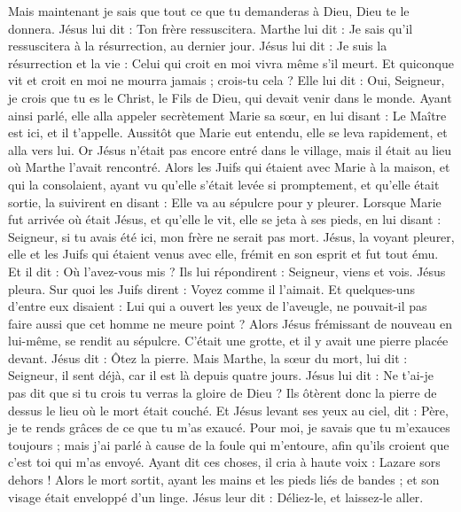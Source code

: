 \begin{multicols}{2}
Mais maintenant je sais que tout ce que tu demanderas à Dieu, Dieu te le donnera.
Jésus lui dit : Ton frère ressuscitera.
Marthe lui dit : Je sais qu'il ressuscitera à la résurrection, au dernier jour.
Jésus lui dit : Je suis la résurrection et la vie : Celui qui croit en moi vivra même s'il meurt.
Et quiconque vit et croit en moi ne mourra jamais ; crois-tu cela ?
Elle lui dit : Oui, Seigneur, je crois que tu es le Christ, le Fils de Dieu, qui devait venir dans le monde.
Ayant ainsi parlé, elle alla appeler secrètement Marie sa sœur, en lui disant : Le Maître est ici, et il t'appelle.
Aussitôt que Marie eut entendu, elle se leva rapidement, et alla vers lui.
Or Jésus n'était pas encore entré dans le village, mais il était au lieu où Marthe l'avait rencontré.
Alors les Juifs qui étaient avec Marie à la maison, et qui la consolaient, ayant vu qu'elle s'était levée si promptement, et qu'elle était sortie, la suivirent en disant : Elle va au sépulcre pour y pleurer.
Lorsque Marie fut arrivée où était Jésus, et qu'elle le vit, elle se jeta à ses pieds, en lui disant : Seigneur, si tu avais été ici, mon frère ne serait pas mort.
Jésus, la voyant pleurer, elle et les Juifs qui étaient venus avec elle, frémit en son esprit et fut tout ému.
Et il dit : Où l'avez-vous mis ? Ils lui répondirent : Seigneur, viens et vois.
Jésus pleura.
Sur quoi les Juifs dirent : Voyez comme il l'aimait.
Et quelques-uns d'entre eux disaient : Lui qui a ouvert les yeux de l'aveugle, ne pouvait-il pas faire aussi que cet homme ne meure point ?
Alors Jésus frémissant de nouveau en lui-même, se rendit au sépulcre. C'était une grotte, et il y avait une pierre placée devant.
Jésus dit : Ôtez la pierre. Mais Marthe, la sœur du mort, lui dit : Seigneur, il sent déjà, car il est là depuis quatre jours.
Jésus lui dit : Ne t'ai-je pas dit que si tu crois tu verras la gloire de Dieu ?
Ils ôtèrent donc la pierre de dessus le lieu où le mort était couché. Et Jésus levant ses yeux au ciel, dit : Père, je te rends grâces de ce que tu m'as exaucé.
Pour moi, je savais que tu m'exauces toujours ; mais j'ai parlé à cause de la foule qui m'entoure, afin qu'ils croient que c'est toi qui m'as envoyé.
Ayant dit ces choses, il cria à haute voix : Lazare sors dehors !
Alors le mort sortit, ayant les mains et les pieds liés de bandes ; et son visage était enveloppé d'un linge. Jésus leur dit : Déliez-le, et laissez-le aller.

\end{multicols}
